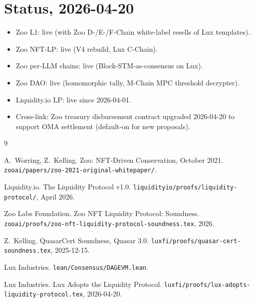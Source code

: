 \documentclass[11pt]{article}
\begin{document}
\section{Status, 2026-04-20}
\label{sec:status}

\begin{itemize}[nosep]
  \item Zoo L1: live (with Zoo D-/E-/F-Chain white-label resells of
        Lux templates).
  \item Zoo NFT-LP: live (V4 rebuild, Lux C-Chain).
  \item Zoo per-LLM chains: live (Block-STM-as-consensus on Lux).
  \item Zoo DAO: live (homomorphic tally, M-Chain MPC threshold
        decrypter).
  \item Liquidity.io LP: live since 2026-04-01.
  \item Cross-link: Zoo treasury disbursement contract upgraded
        2026-04-20 to support OMA settlement (default-on for new
        proposals).
\end{itemize}

\begin{thebibliography}{9}

A.~Worring, Z.~Kelling.
\newblock Zoo: NFT-Driven Conservation, October 2021.
\newblock \texttt{zooai/papers/zoo-2021-original-whitepaper/}.

Liquidity.io.
\newblock The Liquidity Protocol v1.0.
\newblock \texttt{liquidityio/proofs/liquidity-protocol/}, April 2026.

Zoo Labs Foundation.
\newblock Zoo NFT Liquidity Protocol: Soundness.
\newblock \texttt{zooai/proofs/zoo-nft-liquidity-protocol-soundness.tex}, 2026.

Z.~Kelling.
\newblock QuasarCert Soundness, Quasar 3.0.
\newblock \texttt{luxfi/proofs/quasar-cert-soundness.tex}, 2025-12-15.

Lux Industries.
\newblock \texttt{lean/Consensus/DAGEVM.lean}.

Lux Industries.
\newblock Lux Adopts the Liquidity Protocol.
\newblock \texttt{luxfi/proofs/lux-adopts-liquidity-protocol.tex}, 2026-04-20.

\end{thebibliography}
\end{document}
